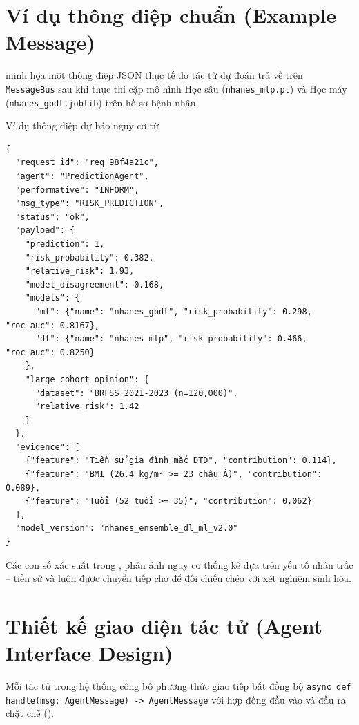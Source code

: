 \section{Ví dụ thông điệp chuẩn (Example Message)}
\label{sec:example-message}

 minh họa một thông điệp JSON thực tế do tác tử dự đoán  trả về trên \texttt{MessageBus} sau khi thực thi cặp mô hình Học sâu (\texttt{nhanes\_mlp.pt}) và Học máy (\texttt{nhanes\_gbdt.joblib}) trên hồ sơ bệnh nhân.

\begin{code}{Ví dụ thông điệp dự báo nguy cơ từ }
\label{code:example-message}
\begin{verbatim}
{
  "request_id": "req_98f4a21c",
  "agent": "PredictionAgent",
  "performative": "INFORM",
  "msg_type": "RISK_PREDICTION",
  "status": "ok",
  "payload": {
    "prediction": 1,
    "risk_probability": 0.382,
    "relative_risk": 1.93,
    "model_disagreement": 0.168,
    "models": {
      "ml": {"name": "nhanes_gbdt", "risk_probability": 0.298, "roc_auc": 0.8167},
      "dl": {"name": "nhanes_mlp", "risk_probability": 0.466, "roc_auc": 0.8250}
    },
    "large_cohort_opinion": {
      "dataset": "BRFSS 2021-2023 (n=120,000)",
      "relative_risk": 1.42
    }
  },
  "evidence": [
    {"feature": "Tiền sử gia đình mắc ĐTĐ", "contribution": 0.114},
    {"feature": "BMI (26.4 kg/m² >= 23 châu Á)", "contribution": 0.089},
    {"feature": "Tuổi (52 tuổi >= 35)", "contribution": 0.062}
  ],
  "model_version": "nhanes_ensemble_dl_ml_v2.0"
}
\end{verbatim}
\end{code}

Các con số xác suất trong  , phản ánh nguy cơ thống kê dựa trên yếu tố nhân trắc -- tiền sử  và luôn được chuyển tiếp cho  để đối chiếu chéo với xét nghiệm sinh hóa.

\section{Thiết kế giao diện tác tử (Agent Interface Design)}
\label{sec:agent-interfaces}

Mỗi tác tử trong hệ thống công bố phương thức giao tiếp bất đồng bộ \texttt{async def handle(msg: AgentMessage) -> AgentMessage} với hợp đồng đầu vào và đầu ra chặt chẽ ().

